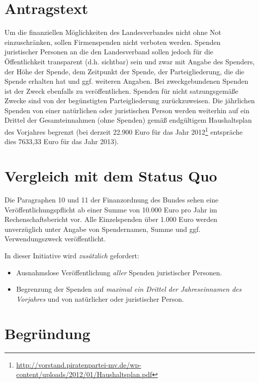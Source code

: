 \section{Antragstext}

Um die finanziellen Möglichkeiten des Landesverbandes nicht ohne Not einzuschränken, sollen Firmenspenden nicht verboten werden. Spenden juristischer Personen an die den Landesverband sollen jedoch für die Öffentlichkeit transparent (d.h. sichtbar) sein und zwar mit Angabe des Spenders, der Höhe der Spende, dem Zeitpunkt der Spende, der Parteigliederung, die die Spende erhalten hat und ggf. weiteren Angaben. Bei zweckgebundenen Spenden ist der Zweck ebenfalls zu veröffentlichen. Spenden für nicht satzungsgemäße Zwecke sind von der begünstigten Parteigliederung zurückzuweisen. Die jährlichen Spenden von einer natürlichen oder juristischen Person werden weiterhin auf ein Drittel der Gesamteinnahmen (ohne Spenden) gemäß endgültigem Haushaltsplan des Vorjahres begrenzt (bei derzeit 22.900 Euro für das Jahr 2012\footnote{\url{http://vorstand.piratenpartei-mv.de/wp-content/uploads/2012/01/Haushaltsplan.pdf}} entspräche dies 7633,33 Euro für das Jahr 2013).

\section{Vergleich mit dem Status Quo}

Die Paragraphen 10 und 11 der Finanzordnung des Bundes sehen eine Veröffentlichungspflicht ab einer Summe von 10.000 Euro pro Jahr im Rechenschaftsbericht vor. Alle Einzelspenden über 1.000 Euro werden unverzüglich unter Angabe von Spendernamen, Summe und ggf. Verwendungszweck veröffentlicht.

In dieser Initiative wird \emph{zusätzlich} gefordert:

\begin{itemize}
\item
  Ausnahmslose Veröffentlichung \emph{aller} Spenden juristischer Personen.
\item
  Begrenzung der Spenden auf \emph{maximal ein Drittel der Jahreseinnamen des Vorjahres} und von natürlicher oder juristischer Person.
\end{itemize}
\section{Begründung}

